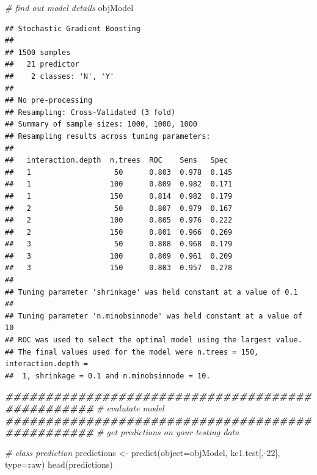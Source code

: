 \documentclass[
]{book}
\newenvironment{Shaded}{\begin{snugshade}}{\end{snugshade}}
\newcommand{\AttributeTok}[1]{\textcolor[rgb]{0.77,0.63,0.00}{#1}}
\newcommand{\CommentTok}[1]{\textcolor[rgb]{0.56,0.35,0.01}{\textit{#1}}}
\newcommand{\DecValTok}[1]{\textcolor[rgb]{0.00,0.00,0.81}{#1}}
\newcommand{\DocumentationTok}[1]{\textcolor[rgb]{0.56,0.35,0.01}{\textbf{\textit{#1}}}}
\newcommand{\FunctionTok}[1]{\textcolor[rgb]{0.00,0.00,0.00}{#1}}
\newcommand{\NormalTok}[1]{#1}
\newcommand{\OtherTok}[1]{\textcolor[rgb]{0.56,0.35,0.01}{#1}}
\newcommand{\SpecialCharTok}[1]{\textcolor[rgb]{0.00,0.00,0.00}{#1}}
\newcommand{\StringTok}[1]{\textcolor[rgb]{0.31,0.60,0.02}{#1}}
\begin{document}
\begin{Shaded}
\begin{Highlighting}[]
\CommentTok{\# find out model details}
\NormalTok{objModel}
\end{Highlighting}
\end{Shaded}

\begin{verbatim}
## Stochastic Gradient Boosting 
## 
## 1500 samples
##   21 predictor
##    2 classes: 'N', 'Y' 
## 
## No pre-processing
## Resampling: Cross-Validated (3 fold) 
## Summary of sample sizes: 1000, 1000, 1000 
## Resampling results across tuning parameters:
## 
##   interaction.depth  n.trees  ROC    Sens   Spec 
##   1                   50      0.803  0.978  0.145
##   1                  100      0.809  0.982  0.171
##   1                  150      0.814  0.982  0.179
##   2                   50      0.807  0.979  0.167
##   2                  100      0.805  0.976  0.222
##   2                  150      0.801  0.966  0.269
##   3                   50      0.808  0.968  0.179
##   3                  100      0.809  0.961  0.209
##   3                  150      0.803  0.957  0.278
## 
## Tuning parameter 'shrinkage' was held constant at a value of 0.1
## 
## Tuning parameter 'n.minobsinnode' was held constant at a value of 10
## ROC was used to select the optimal model using the largest value.
## The final values used for the model were n.trees = 150, interaction.depth =
##  1, shrinkage = 0.1 and n.minobsinnode = 10.
\end{verbatim}

\begin{Shaded}
\begin{Highlighting}[]
\DocumentationTok{\#\#\#\#\#\#\#\#\#\#\#\#\#\#\#\#\#\#\#\#\#\#\#\#\#\#\#\#\#\#\#\#\#\#\#\#\#\#\#\#\#\#\#\#\#\#\#\#\#}
\CommentTok{\# evalutate model}
\DocumentationTok{\#\#\#\#\#\#\#\#\#\#\#\#\#\#\#\#\#\#\#\#\#\#\#\#\#\#\#\#\#\#\#\#\#\#\#\#\#\#\#\#\#\#\#\#\#\#\#\#\#}
\CommentTok{\# get predictions on your testing data}

\CommentTok{\# class prediction}
\NormalTok{predictions }\OtherTok{\textless{}{-}} \FunctionTok{predict}\NormalTok{(}\AttributeTok{object=}\NormalTok{objModel, kc1.test[,}\SpecialCharTok{{-}}\DecValTok{22}\NormalTok{], }\AttributeTok{type=}\StringTok{\textquotesingle{}raw\textquotesingle{}}\NormalTok{)}
\FunctionTok{head}\NormalTok{(predictions)}
\end{Highlighting}
\end{Shaded}
\end{document}
